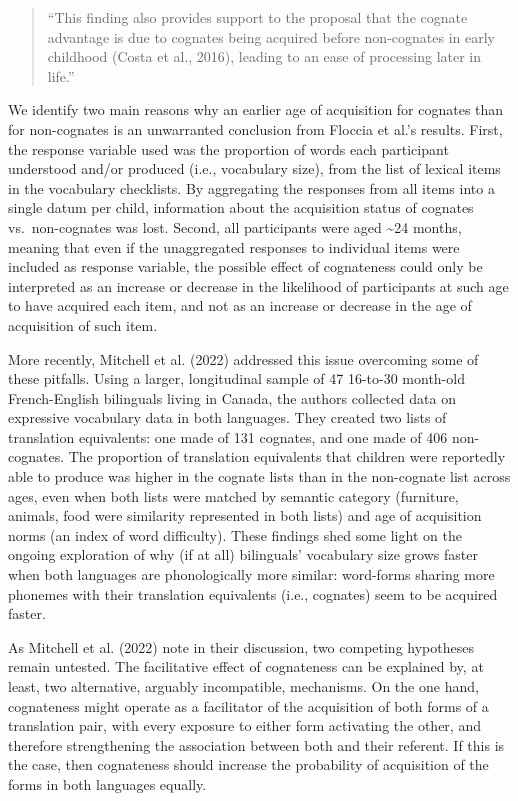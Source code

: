 \documentclass[
  letterpaper,
  DIV=11,
  numbers=noendperiod]{scrartcl}
\begin{document}
\begin{quote}
``This finding also provides support to the proposal that the cognate
advantage is due to cognates being acquired before non-cognates in early
childhood (Costa et al., 2016), leading to an ease of processing later
in life.''
\end{quote}

We identify two main reasons why an earlier age of acquisition for
cognates than for non-cognates is an unwarranted conclusion from Floccia
et al.'s results. First, the response variable used was the proportion
of words each participant understood and/or produced (i.e., vocabulary
size), from the list of lexical items in the vocabulary checklists. By
aggregating the responses from all items into a single datum per child,
information about the acquisition status of cognates vs.~non-cognates
was lost. Second, all participants were aged \textasciitilde24 months,
meaning that even if the unaggregated responses to individual items were
included as response variable, the possible effect of cognateness could
only be interpreted as an increase or decrease in the likelihood of
participants at such age to have acquired each item, and not as an
increase or decrease in the age of acquisition of such item.

More recently, Mitchell et al. (2022) addressed this issue overcoming
some of these pitfalls. Using a larger, longitudinal sample of 47
16-to-30 month-old French-English bilinguals living in Canada, the
authors collected data on expressive vocabulary data in both languages.
They created two lists of translation equivalents: one made of 131
cognates, and one made of 406 non-cognates. The proportion of
translation equivalents that children were reportedly able to produce
was higher in the cognate lists than in the non-cognate list across
ages, even when both lists were matched by semantic category (furniture,
animals, food were similarity represented in both lists) and age of
acquisition norms (an index of word difficulty). These findings shed
some light on the ongoing exploration of why (if at all) bilinguals'
vocabulary size grows faster when both languages are phonologically more
similar: word-forms sharing more phonemes with their translation
equivalents (i.e., cognates) seem to be acquired faster.

As Mitchell et al. (2022) note in their discussion, two competing
hypotheses remain untested. The facilitative effect of cognateness can
be explained by, at least, two alternative, arguably incompatible,
mechanisms. On the one hand, cognateness might operate as a facilitator
of the acquisition of both forms of a translation pair, with every
exposure to either form activating the other, and therefore
strengthening the association between both and their referent. If this
is the case, then cognateness should increase the probability of
acquisition of the forms in both languages equally.
\end{document}
